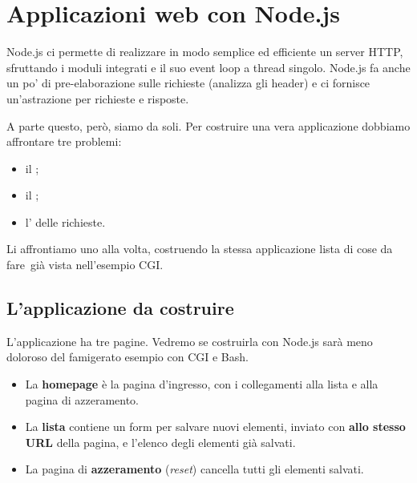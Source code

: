 \chapter{Applicazioni web con Node.js}

Node.js ci permette di realizzare in modo semplice ed efficiente un server HTTP,
sfruttando i moduli integrati e il suo event loop a thread singolo. Node.js fa
anche un po' di pre-elaborazione sulle richieste (analizza gli header) e ci
fornisce un'astrazione per richieste e risposte.

A parte questo, però, siamo da soli. Per costruire una vera applicazione
dobbiamo affrontare tre problemi:

\begin{itemize}
  \item il ;
  \item il ;
  \item l' delle richieste.
\end{itemize}

Li affrontiamo uno alla volta, costruendo la stessa applicazione
\guillemotleft lista di cose da fare\guillemotright\ già vista nell'esempio CGI.

\section{L'applicazione da costruire}

L'applicazione ha tre pagine. Vedremo se costruirla con Node.js sarà meno
doloroso del famigerato esempio con CGI e Bash.

\begin{itemize}
  \item La \textbf{homepage} è la pagina d'ingresso, con i collegamenti alla
        lista e alla pagina di azzeramento.
  \item La \textbf{lista} contiene un form per salvare nuovi elementi, inviato
        con  \textbf{allo stesso URL} della pagina, e l'elenco degli
        elementi già salvati.
  \item La pagina di \textbf{azzeramento} (\textit{reset}) cancella tutti gli
        elementi salvati.
\end{itemize}

